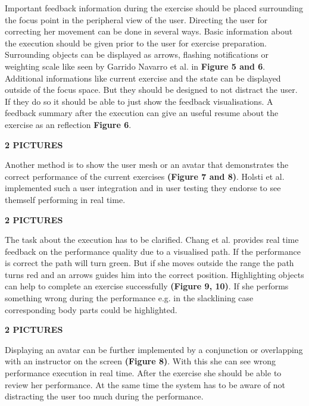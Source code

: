 Important feedback information during the exercise should be placed surrounding the focus point in the peripheral view of the user. Directing the user for correcting her movement can be done in several ways. Basic information about the execution should be given prior to the user for exercise preparation. Surrounding objects can be displayed as arrows, flashing notifications or weighting scale like seen by Garrido Navarro et al. \cite{Garrido2013-zs} in \textbf{Figure 5 and 6}. Additional informations like current exercise and the state can be displayed outside of the focus space. But they should be designed to not distract the user. If they do so it should be able to just show the feedback visualisations. A feedback summary after the execution can give an useful resume about the exercise as an reflection \textbf{Figure 6}.

\textbf{2 PICTURES}

Another method is to show the user mesh or an avatar that demonstrates the correct performance of the current exercises \textbf{(Figure 7 and 8)}. Holsti et al. \cite{Holsti2013-kn} implemented such a user integration and in user testing they endorse to see themself performing in real time.

\textbf{2 PICTURES} \cite{Estepa2016-oj} \cite{Holsti2013-kn}

The task about the execution has to be clarified. Chang et al.\cite{Chang2012-hz} provides real time feedback on the performance quality due to a visualised path. If the performance is correct the path will turn green. But if she moves outside the range the path turns red and an arrows guides him into the correct position.  Highlighting objects can help to complete an exercise successfully \textbf{(Figure 9, 10)}. If she performs something wrong during the performance e.g. in the slacklining case corresponding body parts could be highlighted.

\textbf{2 PICTURES} \cite{Chang2012-hz}

Displaying an avatar can be further implemented by a conjunction or overlapping with an instructor on the screen \textbf{(Figure 8)}. With this she can see wrong performance execution in real time. After the exercise she should be able to review her performance. At the same time the system has to be aware of not distracting the user too much during the performance. 